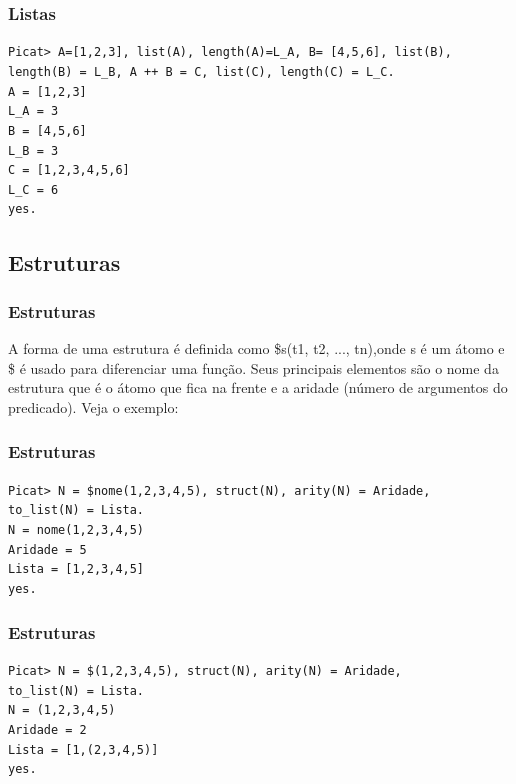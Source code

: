 \documentclass[10pt]{beamer}
\begin{document}

\begin{frame}
    \frametitle{Listas}
    \texttt{Picat> A=[1,2,3], list(A), length(A)=L\_A, B= [4,5,6], list(B),}\\
    \texttt{length(B) = L\_B, A ++ B = C, list(C), length(C) = L\_C.}\\

    \texttt{A = [1,2,3]}\\
    \texttt{L\_A = 3}\\
    \texttt{B = [4,5,6]}\\
    \texttt{L\_B = 3}\\
    \texttt{C = [1,2,3,4,5,6]}\\
    \texttt{L\_C = 6}\\
    \texttt{yes.}
\end{frame}

\subsection{Estruturas}
\begin{frame}
    \frametitle{Estruturas}
    A forma de uma estrutura é definida como \$s(t1, t2, ..., tn),onde s é um átomo e \$ é usado para diferenciar uma função. 
    Seus principais elementos são o nome da estrutura que é o átomo que fica na frente e a aridade (número de argumentos do predicado). 
    Veja o exemplo:
\end{frame}


\begin{frame}
    \frametitle{Estruturas}
    \texttt{Picat> N = \$nome(1,2,3,4,5), struct(N), arity(N) = Aridade,}\\
    \texttt{to\_list(N) = Lista.}\\

    \texttt{N = nome(1,2,3,4,5)}\\
    \texttt{Aridade = 5}\\
    \texttt{Lista = [1,2,3,4,5]}\\
    \texttt{yes.}
\end{frame}


\begin{frame}
    \frametitle{Estruturas}
    \texttt{Picat> N = \$(1,2,3,4,5), struct(N), arity(N) = Aridade,}\\
    \texttt{to\_list(N) = Lista.}\\

    \texttt{N = (1,2,3,4,5)}\\
    \texttt{Aridade = 2}\\
    \texttt{Lista = [1,(2,3,4,5)]}\\
    \texttt{yes.}
\end{frame}
\end{document}
